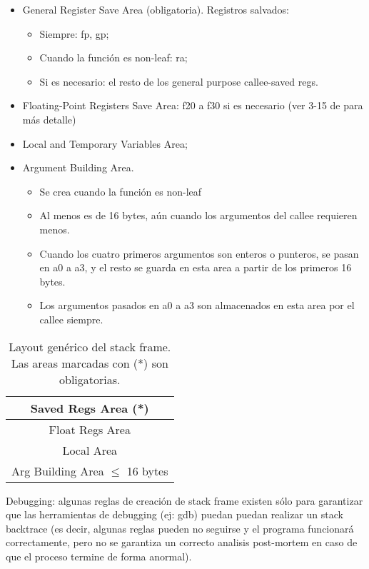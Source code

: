 \begin{itemize}
 \item General Register Save Area (obligatoria). Registros salvados:
 \begin{itemize}
  \item Siempre: fp, gp;
  \item Cuando la función es non-leaf: ra;
  \item Si es necesario: el resto de los general purpose callee-saved regs.
 \end{itemize}
\item Floating-Point Registers Save Area: f20 a f30 si es necesario (ver 3-15 de \cite{abi} para más detalle)
\item Local and Temporary Variables Area;
\item Argument Building Area.
\begin{itemize}
 \item Se crea cuando la función es non-leaf
 \item Al menos es de 16 bytes, aún cuando los argumentos del callee
requieren menos.
 \item Cuando los cuatro primeros argumentos son enteros o punteros,
se pasan en a0 a a3, y el resto se guarda en esta area a partir de
los primeros 16 bytes.
 \item Los argumentos pasados en a0 a a3 son almacenados en esta area
por el callee siempre.
\end{itemize}
\end{itemize}

\begin{table}[!h]
\begin{center}
\begin{tabular}{|c|}\hline
Saved Regs Area (*)\\\hline
Float Regs Area\\\hline
Local Area\\\hline
Arg Building Area
$\leq$ 16 bytes\\\hline
\end{tabular}
\caption{Layout genérico del stack frame. Las areas marcadas con (*) son obligatorias.}
\end{center}
\end{table}


Debugging: algunas reglas de creación de stack frame existen sólo para
garantizar que las herramientas de debugging (ej: gdb) puedan puedan
realizar un stack backtrace (es decir, algunas reglas pueden no seguirse y
el programa funcionará correctamente, pero no se garantiza un correcto
analisis post-mortem en caso de que el proceso termine de forma anormal).

